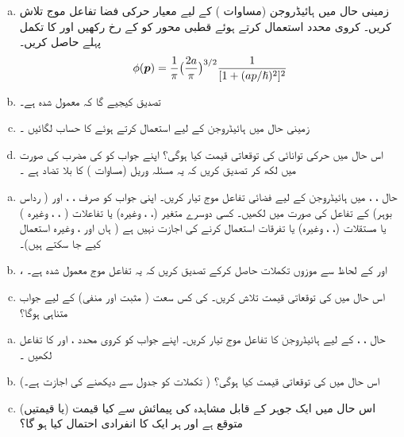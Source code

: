 %
\begin{enumerate}[a.]
\item
زمینی حال میں ہائیڈروجن  (مساوات )  کے لیے معیار حرکی  فضا تفاعل موج تلاش کریں۔  کروی محدد استعمال کرتے ہوئے قطبی محور کو  کے رخ رکھیں اور  کا تکمل پہلے حاصل کریں۔  
\begin{align} 
\phi ({{\boldsymbol{p}}}) = \frac{1}{\pi} \big ( \frac{2a}{\pi} \big )^{3/2} \frac{1}{[1 + (a p/\hslash)^2]^2}
\end{align}
\item
تصدیق کیجیے  گا کہ  معمول شدہ  ہے۔ 
\item
زمینی حال میں ہائیڈروجن  کے لیے  استعمال کرتے ہوئے  کا حساب لگائیں ۔
\item
اس حال میں حرکی توانائی کی توقعاتی قیمت کیا ہوگی؟  اپنے  جواب کو  کی مضرب کی صورت میں لکھ کر تصدیق کریں کہ یہ مسئلہ  وریل   (مساوات  )  کا بلا تضاد ہے ۔
\end{enumerate}
\begin{enumerate}[a.]
\item
حال ، ،    میں ہائیڈروجن کے لیے فضائی تفاعل موج  تیار کریں۔ اپنی جواب کو صرف   ،  ،   اور  ( رداس بوہر)  کے تفاعل کی صورت میں لکھیں۔ کسی دوسرے متغیر (،  ،  وغیرہ)  یا تفاعلات  ( ، ،  وغیرہ ) یا مستقلات  (،  ،  وغیرہ) یا تفرقات استعمال کرنے کی اجازت  نہیں ہے (   ہاں   اور ،  وغیرہ استعمال کیے جا سکتے  ہیں)۔ 
\item
{}،   اور  کے لحاظ سے موزوں  تکملات حاصل کرکے تصدیق کریں کہ  یہ تفاعل موج معمول شدہ ہے۔ 
\item
اس حال میں  کی توقعاتی قیمت تلاش کریں۔   کی کس سعت  ( مثبت اور منفی) کے لیے جواب متناہی ہوگا؟
\end{enumerate}
\begin{enumerate}[a.]
\item
حال ، ،    کے لیے ہائیڈروجن کا تفاعل موج تیار کریں۔ اپنے جواب کو کروی محدد ،   اور  کا تفاعل لکھیں ۔
\item
 اس حال میں  کی توقعاتی قیمت کیا ہوگی؟ ( تکملات  کو جدول سے   دیکھنے  کی  اجازت ہے۔) 
\item
اس حال میں ایک جوہر کے قابل مشاہدہ   کی پیمائش سے کیا قیمت  (یا قیمتیں) متوقع ہے   اور ہر ایک کا انفرادی احتمال کیا ہو گا؟ 
\end{enumerate}
